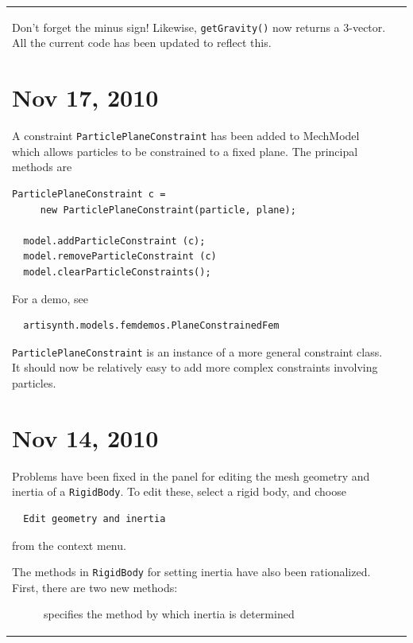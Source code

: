 \documentclass{article}
\begin{document}
\begin{tabular}{ll}
Don't forget the minus sign! Likewise, {\tt getGravity()} now returns a
3-vector. All the current code has been updated to reflect this.

\section*{Nov 17, 2010}

A constraint {\tt ParticlePlaneConstraint} has been added to MechModel
which allows particles to be constrained to a fixed plane. The
principal methods are

\begin{lstlisting}[]
  ParticlePlaneConstraint c = 
     new ParticlePlaneConstraint(particle, plane);

  model.addParticleConstraint (c);
  model.removeParticleConstraint (c)
  model.clearParticleConstraints();
\end{lstlisting}

For a demo, see

\begin{verbatim}
  artisynth.models.femdemos.PlaneConstrainedFem
\end{verbatim}

{\tt ParticlePlaneConstraint} is an instance of a more general constraint
class. It should now be relatively easy to add more complex
constraints involving particles.

\section*{Nov 14, 2010}

Problems have been fixed in the panel for editing the mesh geometry
and inertia of a {\tt RigidBody}. To edit these, select a rigid body, and
choose

\begin{verbatim}
  Edit geometry and inertia
\end{verbatim}

from the context menu.

The methods in {\tt RigidBody} for setting inertia have also been
rationalized. First, there are two new methods:

\begin{description}

\item[{\tt setInertiaMethod (InertiaMethod m)}] \mbox{}

  specifies the method by which inertia is determined


\end{description}
\end{tabular}
\end{document}
